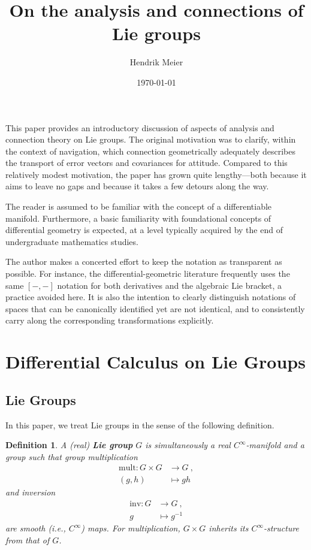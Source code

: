 \documentclass[10pt,a4paper]{article}
\title{On the analysis and connections of Lie groups}
\author{Hendrik Meier}
\affil{Oberuhldingen}
\affil{}
\date{\today}
\theoremstyle{mytheorem}
\theoremstyle{mydefinition}
\newtheorem{definition}[theorem]{Definition}
\newcommand{\mydef}[1]{\textbf{\textit{#1}}}
\begin{document}
\maketitle

This paper provides an introductory discussion of aspects of analysis and connection theory on Lie groups. 
The original motivation was to clarify, within the context of navigation, which connection geometrically adequately describes the transport of error vectors and covariances for attitude. 
Compared to this relatively modest motivation, the paper has grown quite lengthy---both because it aims to leave no gaps and because it takes a few detours along the way.

The reader is assumed to be familiar with the concept of a differentiable manifold. 
Furthermore, a basic familiarity with foundational concepts of differential geometry is expected, at a level typically acquired by the end of undergraduate mathematics studies.

The author makes a concerted effort to keep the notation as transparent as possible. For instance, the differential-geometric literature frequently uses the same $[-,-]$ notation for both derivatives and the algebraic Lie bracket, a practice avoided here. 
It is also the intention to clearly distinguish notations of spaces that can be canonically identified yet are not identical, and to consistently carry along the corresponding transformations explicitly.

\section{Differential Calculus on Lie Groups}

\subsection{Lie Groups}

In this paper, we treat Lie groups in the sense of the following definition.

\begin{definition}
A (real) \mydef{Lie group} $G$ is simultaneously a real $C^\infty$-manifold and a group such that group multiplication
\begin{align*}
	\mathrm{mult}:
	G\times G&\rightarrow G
	\ ,\nonumber\\
	(g, h) &\mapsto gh
\end{align*}
and inversion
\begin{align*}
	\mathrm{inv}:
	G&\rightarrow G
	\ ,\nonumber\\
	g &\mapsto g^{-1}
\end{align*}
are smooth (i.e., $C^\infty$) maps.
For multiplication, $G\times G$ inherits its $C^\infty$-structure from that of $G$.
\end{definition}
\end{document}
